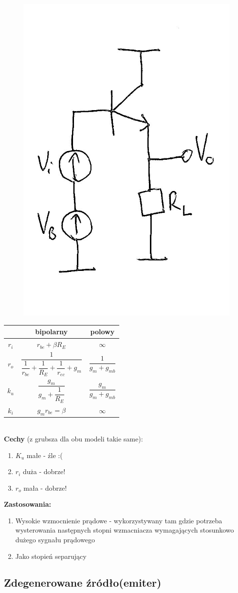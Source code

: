 \documentclass[10pt,a4paper]{article}
\begin{document}
\begin{figure}[H]
\centering
\includegraphics[height=0.5\textwidth]{WC}
\end{figure}
\begin{tabular}{c|c|c}
& bipolarny & polowy\\
\hline
$r_i$ & $r_{be} + \beta R_E$ & $\infty$ \\ 

$r_o$ & $\dfrac{1}{\dfrac{1}{r_{be}}+\dfrac{1}{R_E}+\dfrac{1}{r_{ec}}+g_m}$ & $\dfrac{1}{g_m + g_{mb}}$ \\ 

$k_u$ & $\dfrac{g_m}{g_m+\dfrac{1}{R_E}}$ & $\dfrac{g_m}{g_m+g_{mb}}$ \\ 

$k_i$ & $g_m r_{be} = \beta$ & $\infty$ \\ 

\end{tabular} 
\\
\textbf{Cechy} (z grubsza dla obu modeli takie same):
\begin{enumerate}
	\item \textbf{$K_u$} małe - źle :(
	\item \textbf{$r_i$} duża - dobrze!
	\item \textbf{$r_o$} mała - dobrze!
\end{enumerate}
\textbf{Zastosowania:}
\begin{enumerate}
	\item Wysokie wzmocnienie prądowe - wykorzystywany tam gdzie potrzeba wysterowania następnych stopni wzmacniacza wymagających stosunkowo dużego sygnału prądowego
	\item Jako stopień separujący
\end{enumerate}


\subsection{Zdegenerowane źródło(emiter)}
\end{document}
